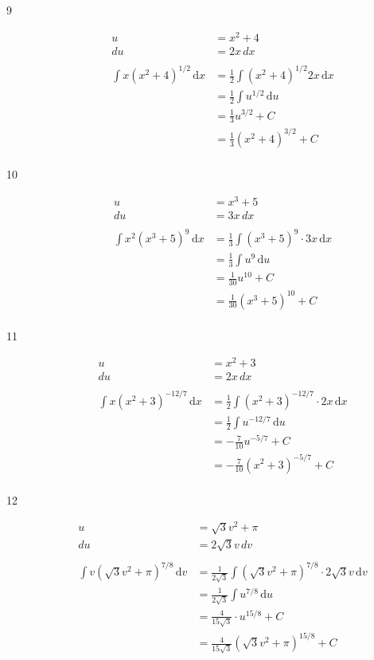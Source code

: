 \documentclass{exam}
\begin{document}
\begin{description}
\item[9]
\begin{align*}
  u &= x^2 + 4 \\
  du &= 2x \, dx \\
\\
  \int x (x^2 + 4)^{1/2} \, \mathrm{d}x &= \frac{1}{2} \int (x^2 + 4)^{1/2} 2x \, \mathrm{d}x \\
  &= \frac{1}{2} \int u^{1/2} \, \mathrm{d}u \\
  &= \frac{1}{3} u^{3/2} + C \\
  &= \frac{1}{3} (x^2 + 4)^{3/2} + C \\
\end{align*}

\item[10]
\begin{align*}
  u &= x^3 + 5 \\
  du &= 3x \, dx \\
\\
  \int x^2 (x^3 + 5)^9 \, \mathrm{d}x &= \frac{1}{3} \int (x^3 + 5)^9 \cdot 3x \, \mathrm{d}x \\
  &= \frac{1}{3} \int u^9 \, \mathrm{d}u \\
  &= \frac{1}{30} u^{10} + C \\
  &= \frac{1}{30} (x^3 + 5)^{10} + C \\
\end{align*}

\item[11]
\begin{align*}
  u &= x^2 + 3 \\
  du &= 2x \, dx \\
\\
  \int x (x^2 + 3)^{-12/7} \, \mathrm{d}x &= \frac{1}{2} \int (x^2 + 3)^{-12/7} \cdot 2x \, \mathrm{d}x \\
  &= \frac{1}{2} \int u^{-12/7} \, \mathrm{d}u \\
  &= - \frac{7}{10} u^{-5/7} + C \\
  &= - \frac{7}{10} (x^2 + 3)^{-5/7} + C \\
\end{align*}

\item[12]
\begin{align*}
  u &= \sqrt{3} v^2 + \pi \\
  du &= 2 \sqrt{3} v \, dv \\
\\
  \int v \left(\sqrt{3} v^2 + \pi\right)^{7/8} \, \mathrm{d}v &= \frac{1}{2 \sqrt{3}} \int \left(\sqrt{3} v^2 + \pi\right)^{7/8} \cdot 2 \sqrt{3} v \, \mathrm{d}v \\
  &= \frac{1}{2 \sqrt{3}} \int u^{7/8} \, \mathrm{d}u \\
  &= \frac{4}{15 \sqrt{3}} \cdot u^{15/8} + C \\
  &= \frac{4}{15 \sqrt{3}} \left(\sqrt{3} v^2 + \pi\right)^{15/8} + C \\
\end{align*}


\end{description}
\end{document}
